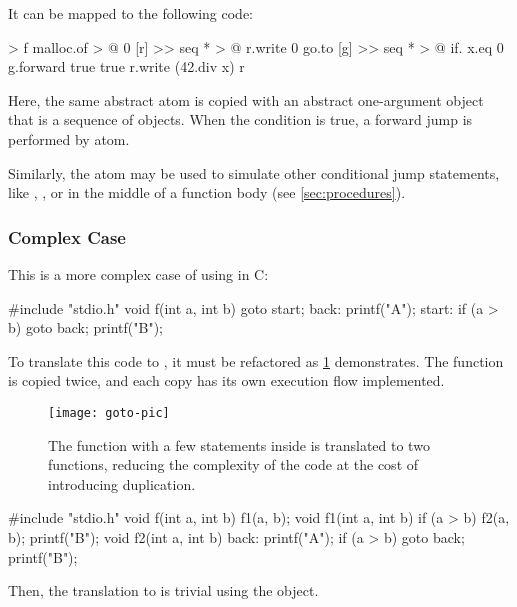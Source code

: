 \documentclass[sigplan,nonacm]{acmart}
\begin{document}
It can be mapped to the following \eolang{} code:

\begin{ffcode}
[x] > f
  malloc.of > @
    0
    [r] >>
      seq * > @
        r.write 0
        go.to
          [g] >>
            seq * > @
              if.
                x.eq 0
                g.forward true
                true
              r.write (42.div x)
        r
\end{ffcode}

Here, the same abstract atom  is copied with an abstract one-argument object that is a sequence of objects.
When the condition is true, a forward jump is performed by  atom.

Similarly, the atom  may be used to simulate other conditional jump statements, like , , or  in the middle of a function body (see \cref{sec:procedures}).

\subsubsection{Complex Case}

This is a more complex case of using  in C:

\begin{ffcode}
#include "stdio.h"
void f(int a, int b) {
  goto start;
back:
  printf("A");
start:
  if (a > b) goto back;
  printf("B");
}
\end{ffcode}

To translate this code to \eolang{}, it must be refactored as \cref{fig:goto} demonstrates.
The function  is copied twice, and each copy has its own execution flow implemented.

\begin{figure}
\texttt{[image: goto-pic]}
\caption{The function  with a few  statements inside is translated to two functions, reducing the complexity of the code at the cost of introducing duplication.}
\label{fig:goto}
\end{figure}

\begin{ffcode}
#include "stdio.h"
void f(int a, int b) { f1(a, b); }
void f1(int a, int b) {
  if (a > b) f2(a, b);
  printf("B");
}
void f2(int a, int b) {
back:
  printf("A");
  if (a > b) goto back;
  printf("B");
}
\end{ffcode}

Then, the translation to \eolang{} is trivial using the  object.
\end{document}
